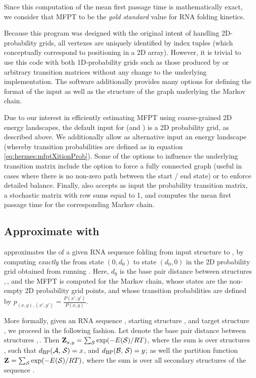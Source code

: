 Since this computation of the
mean first passage time is mathematically exact, we consider that MFPT
to be the {\em gold standard} value for RNA folding kinetics.

Because this program was designed with the original intent
of handling 2D-probability grids, all vertexes are uniquely identified
by index tuples (which conceptually correspond to positioning in a 2D
array). However, it is trivial to use this code with both
1D-probability grids such as those produced by \fftbor
\citep{Senter.po12} or arbitrary transition matrices without any change
to the underlying implementation. The software additionally provides
many options for defining the format of the input as well as the
structure of the graph underlying the
Markov chain.

Due to our interest in efficiently estimating MFPT using coarse-grained 2D
energy landscapes, the default input for \rnamfpt (and \rnaeq) is a 2D
probability grid, as described above. We additionally allow as alternative input
an energy landscape (whereby transition probabilities are defined as in
equation \ref{eq:hermes:mfptXitionProb}).
Some of the options to influence the underlying transition matrix
include the option to force a fully
connected graph (useful in cases where there is no non-zero path
between the start / end state) or to enforce detailed balance.
Finally, \rnamfpt also accepts as input the probability transition matrix,
a stochastic matrix with row sums equal to 1, and computes the mean
first passage time for the corresponding Markov chain.

\subsection{Approximate \mfpt with \fftmfpt}
\label{subsec:hermes:fftmfpt}

\fftmfpt approximates the \mfpt of a given RNA
sequence folding from input structure \strA to \strB, by
computing {\em exactly} the \mfpt from state $(0,d_0)$ to state
$(d_0,0)$ in the 2D probability grid obtained from running
\ffttwo. Here, $d_0$ is the base pair distance between structures
\strA,\,\strB, and the MFPT is computed for the Markov chain, whose states are
the non-empty 2D probability grid points, and whose transition
probabilities are defined by $p_{(x,y),(x',y')} =
\frac{P(x',y')}{P(x,y)}$.

More formally, given an RNA sequence \seq, starting structure \strA, and
target structure \strB, we proceed in the following fashion. Let \dBP{\strA}{\strB} denote the base pair distance between structures
\strA,\,\strB. Then ${\bf Z}^{}_{x,y} = \sum_\mathcal S \exp(-E(\mathcal S)/RT)$, where the sum is over
structures \str, such that $d_{\text{BP}}(\mathcal A,\,\mathcal S) = x$, and
$d_{\text{BP}}(\mathcal B,\,\mathcal S) = y$; as
well the partition function ${\bf Z}^{}_{} = \sum_\mathcal S \exp(-E(\mathcal S)/RT)$, where the sum
is over all secondary structures \str of the sequence \seq.

